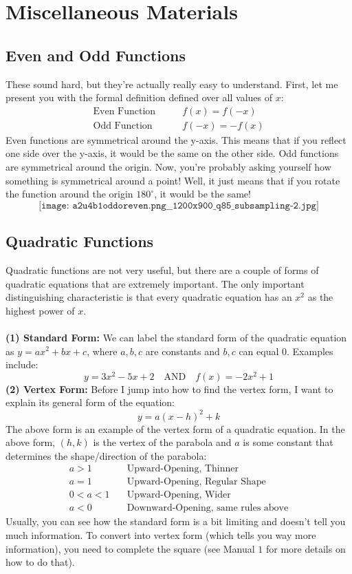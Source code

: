 \section{Miscellaneous Materials}
\subsection{Even and Odd Functions}
These sound hard, but they're actually really easy to understand. First, let me present you with the formal definition defined over all values of $x$:
\begin{align*}
    \text{Even Function} & \quad \quad f(x) = f(-x) \\
    \text{Odd Function} & \quad \quad f(-x) = -f(x)
\end{align*}
Even functions are symmetrical around the y-axis. This means that if you reflect one side over the y-axis, it would be the same on the other side. Odd functions are symmetrical around the origin. Now, you're probably asking yourself how something is symmetrical around a point! Well, it just means that if you rotate the function around the origin $180^\circ$, it would be the same!
$$
\texttt{[image: a2u4b1oddoreven.png\_\_1200x900\_q85\_subsampling-2.jpg]}
$$
\subsection{Quadratic Functions}
Quadratic functions are not very useful, but there are a couple of forms of quadratic equations that are extremely important. The only important distinguishing characteristic is that every quadratic equation has an $x^2$ as the highest power of $x$.\\
\\
\textbf{(1) Standard Form:} We can label the standard form of the quadratic equation as $y = ax^2 + bx + c$, where $a,b,c$ are constants and $b,c$ can equal $0$. Examples include:
$$
y = 3x^2 - 5x + 2 \quad \text{AND} \quad f(x) = -2x^2 + 1
$$
\textbf{(2) Vertex Form:} Before I jump into how to find the vertex form, I want to explain its general form of the equation:
$$
y = a(x-h)^2 + k
$$
The above form is an example of the vertex form of a quadratic equation. In the above form, $(h,k)$ is the vertex of the parabola and $a$ is some constant that determines the shape/direction of the parabola:
\begin{align*}
    a > 1 & \quad \text{Upward-Opening, Thinner} \\
    a = 1 & \quad \text{Upward-Opening, Regular Shape}\\
    0 < a < 1 & \quad \text{Upward-Opening, Wider} \\
    a < 0 & \quad \text{Downward-Opening, same rules above}
\end{align*}
Usually, you can see how the standard form is a bit limiting and doesn't tell you much information. To convert into vertex form (which tells you way more information), you need to complete the square (see Manual $1$ for more details on how to do that).
